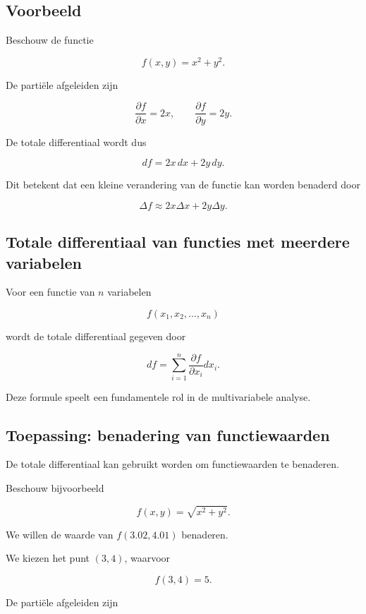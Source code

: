 \documentclass[11pt,a4paper]{article}
\begin{document}
    \subsection{Voorbeeld}

    Beschouw de functie

    \[
        f(x,y)=x^2+y^2.
    \]

    De partiële afgeleiden zijn

    \[
        \frac{\partial f}{\partial x}=2x,
        \qquad
        \frac{\partial f}{\partial y}=2y.
    \]

    De totale differentiaal wordt dus

    \[
        df = 2x\,dx + 2y\,dy.
    \]

    Dit betekent dat een kleine verandering van de functie kan worden
    benaderd door

    \[
        \Delta f \approx 2x\Delta x + 2y\Delta y.
    \]

    \subsection{Totale differentiaal van functies met meerdere variabelen}

    Voor een functie van $n$ variabelen

    \[
        f(x_1,x_2,\dots,x_n)
    \]

    wordt de totale differentiaal gegeven door

    \[
        df
        =
        \sum_{i=1}^{n}
        \frac{\partial f}{\partial x_i}dx_i.
    \]

    Deze formule speelt een fundamentele rol in de multivariabele analyse.

    \subsection{Toepassing: benadering van functiewaarden}

    De totale differentiaal kan gebruikt worden om functiewaarden te
    benaderen.

    Beschouw bijvoorbeeld

    \[
        f(x,y)=\sqrt{x^2+y^2}.
    \]

    We willen de waarde van $f(3.02,4.01)$ benaderen.

    We kiezen het punt $(3,4)$, waarvoor

    \[
        f(3,4)=5.
    \]

    De partiële afgeleiden zijn
\end{document}
